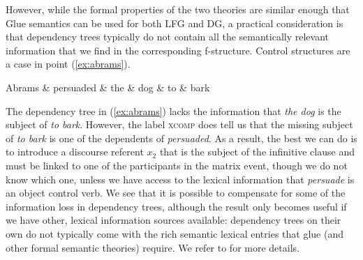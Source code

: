 \documentclass[output=paper,hidelinks]{langscibook}
\begin{document}
However, while the formal properties of the two theories are similar
enough that Glue semantics can be used for both LFG and DG, a practical consideration is that dependency trees typically do not contain all the semantically relevant information that we find in the 
corresponding f-structure. Control structures are a case in point (\ref{ex:abrams}).
\begin{exe}
  \ex\label{ex:abrams}
\begin{dependency}[baseline=-0.6ex,theme=simple]
  \begin{deptext}
    Abrams \& persuaded \& the \& dog \& to \& bark \\
  \end{deptext}
\end{dependency}
\end{exe}
%
The dependency tree in (\ref{ex:abrams}) lacks the information that
\textit{the dog} is the subject of \textit{to bark}. However, the
label \textsc{xcomp} does tell us that the missing subject of
\textit{to bark} is one of the dependents of \textit{persuaded}. As a
result, the best we can do is to introduce a discourse referent $x_2$
that is the subject of the infinitive clause and must be linked to one
of the participants in the matrix event, though we do not know which
one, unless we have access to the lexical information that
\textit{persuade} is an object control verb.
%
%
We see that it is possible to compensate for some of the information
loss in dependency trees, although the result only becomes useful if
we have other, lexical information sources available: dependency trees
on their own do not typically come with the rich semantic
lexical entries that glue (and other formal semantic theories)
require.
We refer to
\citet{gotham-haug:2018} for more details.
\end{document}
